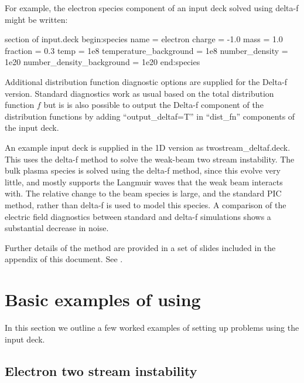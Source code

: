 For example, the electron species component of an input deck solved using
delta-f might be written:

\begin{lboxverbatim}{section of input.deck}
begin:species
   name = electron
   charge = -1.0
   mass  = 1.0
   fraction = 0.3
   temp = 1e8
   temperature_background = 1e8
   number_density = 1e20
   number_density_background = 1e20
end:species
\end{lboxverbatim}

Additional distribution function diagnostic options are supplied for the
Delta-f version. Standard diagnostics work as usual based on the total
distribution function $f$ but is is also possible to output the Delta-f
component of the distribution functions by adding ``output\_deltaf=T'' in
``dist\_fn'' components of the input deck.

An example input deck is supplied in the 1D {\EPOCH} version as
twostream\_deltaf.deck. This uses the delta-f method to solve the weak-beam
two stream instability. The bulk plasma species is solved using the delta-f
method, since this evolve very little, and mostly supports the Langmuir waves
that the weak beam interacts with. The relative change to the beam species is
large, and the standard PIC method, rather than delta-f is used to model this
species. A comparison of the electric field diagnostics between standard and
delta-f simulations shows a substantial decrease in noise.

Further details of the method are provided in a set of slides included in the
appendix of this document. See .

\section{\texorpdfstring
  {Basic examples of using {\EPOCH}}
  {Basic examples of using {EPOCH}}}
\label{sec:examples}

In this section we outline a few worked examples of setting up problems
using the {\EPOCH} input deck.

\subsection{Electron two stream instability}

